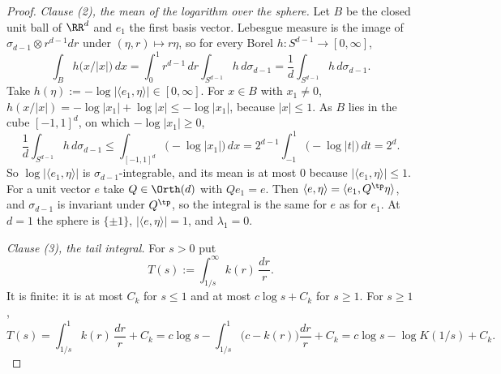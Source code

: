 \begin{proof}
\emph{Clause (2), the mean of the logarithm over the sphere.} Let $B$ be the closed unit ball of
$\RR^d$ and $e_1$ the first basis vector. Lebesgue measure is the image of
$\sigma_{d-1} \otimes r^{d-1}dr$ under $(\eta, r) \mapsto r\eta$, so for every Borel
$h : S^{d-1} \to [0,\infty]$,
\[
  \int_B h\bigl(x/|x|\bigr)\,dx = \int_0^1 r^{d-1}\,dr\int_{S^{d-1}}h\,d\sigma_{d-1}
   = \frac1d\int_{S^{d-1}}h\,d\sigma_{d-1} .
\]
Take $h(\eta) := -\log|\langle e_1,\eta\rangle| \in [0,\infty]$. For $x \in B$ with $x_1 \ne 0$,
$h(x/|x|) = -\log|x_1| + \log|x| \le -\log|x_1|$, because $|x| \le 1$. As $B$ lies in the cube
$[-1,1]^d$, on which $-\log|x_1| \ge 0$,
\[
  \frac1d\int_{S^{d-1}}h\,d\sigma_{d-1} \le \int_{[-1,1]^d}\bigl(-\log|x_1|\bigr)\,dx
   = 2^{d-1}\int_{-1}^{1}\bigl(-\log|t|\bigr)\,dt = 2^{d} .
\]
So $\log|\langle e_1,\eta\rangle|$ is $\sigma_{d-1}$-integrable, and its mean is at most $0$
because $|\langle e_1,\eta\rangle| \le 1$. For a unit vector $e$ take $Q \in \Orth(d)$ with
$Qe_1 = e$. Then $\langle e,\eta\rangle = \langle e_1, Q^{\tp}\eta\rangle$, and $\sigma_{d-1}$ is
invariant under $Q^{\tp}$, so the integral is the same for $e$ as for $e_1$. At $d = 1$ the
sphere is $\{\pm1\}$, $|\langle e,\eta\rangle| = 1$, and $\lambda_1 = 0$.

\emph{Clause (3), the tail integral.} For $s > 0$ put
\[
  T(s) := \int_{1/s}^{\infty}k(r)\,\frac{dr}{r} .
\]
It is finite: it is at most $C_k$ for $s \le 1$ and at most $c\log s + C_k$ for $s \ge 1$. For
$s \ge 1$,
\begin{equation}\label{eq:profile-tail}
  T(s) = \int_{1/s}^{1}k(r)\,\frac{dr}{r} + C_k
       = c\log s - \int_{1/s}^{1}\bigl(c - k(r)\bigr)\frac{dr}{r} + C_k
       = c\log s - \log K(1/s) + C_k .
\end{equation}


\end{proof}
